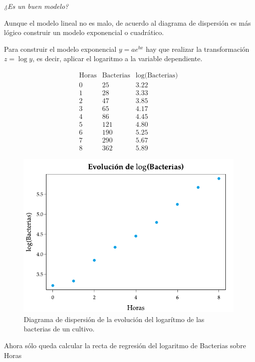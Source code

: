 \documentclass[
  a4paper,
]{scrreport}
\theoremstyle{plain}
\theoremstyle{definition}
\theoremstyle{definition}
\theoremstyle{remark}
\begin{document}
\emph{¿Es un buen modelo?}

Aunque el modelo lineal no es malo, de acuerdo al diagrama de dispersión
es más lógico construir un modelo exponencial o cuadrático.

Para construir el modelo exponencial \(y = ae^{bx}\) hay que realizar la
transformación \(z=\log y\), es decir, aplicar el logaritmo a la
variable dependiente.

\[\begin{array}{c|c|c}
\mbox{Horas} & \mbox{Bacterias} & \mbox{$\log$(Bacterias)}\\
\hline
0 &  25 & 3.22\\
1 & 28 & 3.33\\
2 &  47 & 3.85\\
3 & 65  & 4.17\\
4 & 86 & 4.45\\
5 & 121 & 4.80\\
6 & 190 & 5.25\\
7 & 290 & 5.67\\
8 & 362 & 5.89
\end{array}
\]

\begin{figure}[H]

{\centering \includegraphics{img/regresion/evolucion_log_bacterias.pdf}

}

\caption{Diagrama de dispersión de la evolución del logarítmo de las
bacterias de un cultivo.}

\end{figure}%

Ahora sólo queda calcular la recta de regresión del logaritmo de
Bacterias sobre Horas
\end{document}
